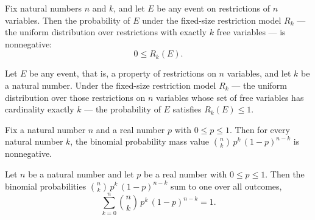 \begin{lemma}
\label{BernoulliCost.fixedSizeRestrProb_nonneg}
\leanok
{}
Fix natural numbers $n$ and $k$, and let $E$ be any event on restrictions of $n$
variables. Then the probability of $E$ under the fixed-size restriction model $R_k$ —
the uniform distribution over restrictions with exactly $k$ free variables — is
nonnegative:
\[
0 \le R_k(E).
\]
\end{lemma}

\begin{lemma}
\label{BernoulliCost.fixedSizeRestrProb_le_one}
\leanok
{}
Let $E$ be any event, that is, a property of restrictions on $n$ variables, and let $k$
be a natural number. Under the fixed-size restriction model $R_k$ — the uniform
distribution over those restrictions on $n$ variables whose set of free variables has
cardinality exactly $k$ — the probability of $E$ satisfies $R_k(E) \le 1$.
\end{lemma}

\begin{lemma}
\label{BernoulliCost.binomialPMF_nonneg}
\leanok
{}
Fix a natural number $n$ and a real number $p$ with $0 \le p \le 1$. Then for every
natural number $k$, the binomial probability mass value $\binom{n}{k}\, p^k\,
(1-p)^{n-k}$ is nonnegative.
\end{lemma}

\begin{lemma}
\label{BernoulliCost.binomialPMF_sum_one}
\leanok
{}
Let $n$ be a natural number and let $p$ be a real number with $0 \le p \le 1$. Then the
binomial probabilities $\binom{n}{k}\, p^k\, (1-p)^{n-k}$ sum to one over all outcomes,
\[\sum_{k=0}^{n} \binom{n}{k}\, p^k\, (1-p)^{n-k} = 1.\]
\end{lemma}

